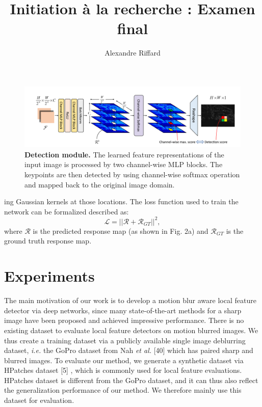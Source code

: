 \documentclass[10pt,twocolumn,letterpaper]{article}
\title{Initiation à la recherche : Examen final}
\author{Alexandre Riffard
}
\begin{document}
\maketitle
\nocite{*}


\begin{figure}
    \centering
    \includegraphics[width=17cm]{images/fig3.png}
    \caption{\textbf{Detection module.} The learned feature representations of the input image is processed by two channel-wise MLP blocks. The keypoints are then detected by using channel-wise softmax operation and mapped back to the original image domain.}
    \label{fig:Fig3}
\end{figure}

\noindent ing Gaussian kernels at those locations. The loss function used to train the network can be formalized described as:
\begin{equation}
        \mathcal{L} = ||\mathcal{R} + \mathcal{R}_{GT}||^2,
\end{equation}
where $\mathcal{R}$ is the predicted response map (as shown in Fig. 2a) and $\mathcal{R}_{GT}$ is the ground truth response map.
\section{Experiments}
The main motivation of our work is to develop a motion blur aware local feature detector via deep networks, since many state-of-the-art methods for a sharp image have been proposed and achieved impressive performance. There is no existing dataset to evaluate local feature detectors on motion blurred images. We thus create a training dataset via a publicly available single image deblurring dataset, \textit{i.e.} the GoPro dataset from Nah \textit{et al.} [40] which has paired sharp and
blurred images. To evaluate our method, we generate a synthetic dataset via HPatches dataset [5] , which is commonly used for local feature evaluations. HPatches dataset is different from the GoPro dataset, and it can thus also reflect the generalization performance of our method. We therefore mainly use this dataset for evaluation.
\end{document}
